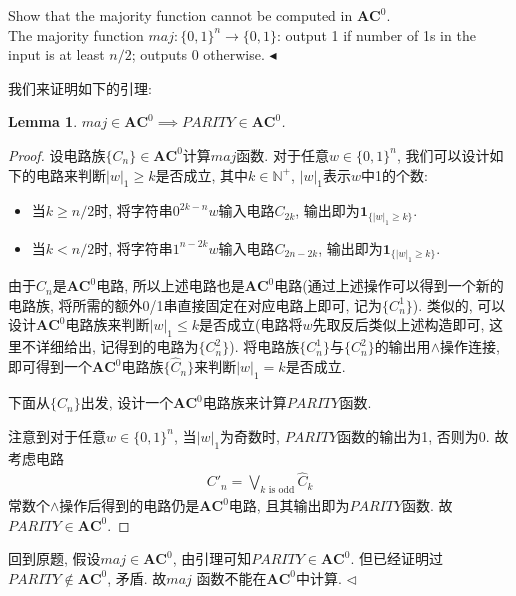 \documentclass[11pt]{article}
\newtheorem{lemma}[theorem]{Lemma}
\newcommand{\AC}{\mathbf{AC}}
\newcommand{\1}{\mathbf{1}}
\newenvironment{problem}[2][Problem]{\begin{trivlist}
\item[\hskip \labelsep{\bfseries#1}\hskip\labelsep{\bfseries#2.}]}{\hfill$\blacktriangleleft$\end{trivlist}}
\newenvironment{answer}[1][Solution]{\begin{trivlist}
\item[\hskip \labelsep{\bfseries#1.}\hskip \labelsep]}{\hfill$\lhd$\end{trivlist}}
\begin{document}
\begin{problem}{2.(24 points)}
    Show that the majority function cannot be computed in $\AC^0$.
    \\The majority function $maj: \{0,1\}^n \rightarrow \{0,1\}$: output 1 if number of 1s in the input is at least $n/2$; outputs 0 otherwise.
\end{problem}
\begin{answer}
    我们来证明如下的引理:
    \begin{lemma}
        $maj \in \AC^0 \implies {PARITY} \in \AC^0$.
    \end{lemma}
    \begin{proof}
        设电路族$\{C_n\} \in \AC^0$计算$maj$函数. 对于任意$w \in \{0,1\}^n$, 我们可以设计如下的电路来判断$|w|_1 \ge k$是否成立, 其中$k\in \mathbb{N}^+$, $|w|_1$表示$w$中1的个数:
        \begin{itemize}
            \item 当$ k \ge n/2$时, 将字符串$0^{2k-n}w$输入电路$C_{2k}$, 输出即为$\1_{\{|w|_1 \ge k\}}$.
            \item 当$ k < n/2$时, 将字符串$1^{n-2k}w$输入电路$C_{2n-2k}$, 输出即为$\1_{\{|w|_1 \ge k\}}$.
        \end{itemize} 
        由于$C_n$是$\AC^0$电路, 所以上述电路也是$\AC^0$电路(通过上述操作可以得到一个新的电路族, 将所需的额外0/1串直接固定在对应电路上即可, 记为$\{C^1_n\}$). 类似的, 可以设计$\AC^0$电路族来判断$|w|_1 \le k$是否成立(电路将$w$先取反后类似上述构造即可, 这里不详细给出, 记得到的电路为$\{C_n^2\}$). 将电路族$\{C_n^1\}$与$\{C_n^2\}$的输出用$\land$操作连接, 即可得到一个$\AC^0$电路族$\{\widehat{C}_n\}$来判断$|w|_1 = k$是否成立. 

        下面从$\{\widehat{C}_n\}$出发, 设计一个$\AC^0$电路族来计算$PARITY$函数. 

        注意到对于任意$w \in \{0,1\}^n$, 当$|w|_1$为奇数时, $PARITY$函数的输出为1, 否则为0. 故考虑电路
        \begin{align*}
            C'_n = \bigvee_{k \text{ is odd}} \widehat{C}_k
        \end{align*}
        常数个$\land$操作后得到的电路仍是$\AC^0$电路, 且其输出即为$PARITY$函数. 故$PARITY \in \AC^0$.
    \end{proof}
    回到原题, 假设$maj \in \AC^0$, 由引理可知$PARITY \in \AC^0$. 但已经证明过$PARITY \notin \AC^0$, 矛盾. 故$maj$ 函数不能在$\AC^0$中计算.
\end{answer}
\end{document}
